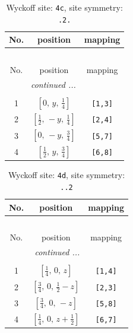 \documentclass[fleqn,8pt]{jsarticle}
\begin{document}
\renewcommand{\arraystretch}{1.2}
\begin{longtable}{ccc}
\caption{Wyckoff site: {\tt 4c}, site symmetry: {\tt .2.}}
 \\
 \hline \hline
No. & position & mapping \\ \hline \endfirsthead

\multicolumn{2}{l}{\tablename\ \thetable{}} \\
 \hline \hline
No. & position & mapping \\ \hline \endhead

 \hline \hline
\multicolumn{2}{r}{\footnotesize\it continued ...} \\ \endfoot

 \hline \hline
\multicolumn{2}{r}{} \\ \endlastfoot

1 & $\left[ 0,\, y,\, \frac{1}{4} \right]$ & {\tt [1,3]} \\ \hline
2 & $\left[ \frac{1}{2},\, - y,\, \frac{1}{4} \right]$ & {\tt [2,4]} \\ \hline
3 & $\left[ 0,\, - y,\, \frac{3}{4} \right]$ & {\tt [5,7]} \\ \hline
4 & $\left[ \frac{1}{2},\, y,\, \frac{3}{4} \right]$ & {\tt [6,8]} \\
\end{longtable}
\renewcommand{\arraystretch}{1.2}
\begin{longtable}{ccc}
\caption{Wyckoff site: {\tt 4d}, site symmetry: {\tt ..2}}
 \\
 \hline \hline
No. & position & mapping \\ \hline \endfirsthead

\multicolumn{2}{l}{\tablename\ \thetable{}} \\
 \hline \hline
No. & position & mapping \\ \hline \endhead

 \hline \hline
\multicolumn{2}{r}{\footnotesize\it continued ...} \\ \endfoot

 \hline \hline
\multicolumn{2}{r}{} \\ \endlastfoot

1 & $\left[ \frac{1}{4},\, 0,\, z \right]$ & {\tt [1,4]} \\ \hline
2 & $\left[ \frac{3}{4},\, 0,\, \frac{1}{2} - z \right]$ & {\tt [2,3]} \\ \hline
3 & $\left[ \frac{3}{4},\, 0,\, - z \right]$ & {\tt [5,8]} \\ \hline
4 & $\left[ \frac{1}{4},\, 0,\, z + \frac{1}{2} \right]$ & {\tt [6,7]} \\
\end{longtable}
\end{document}
